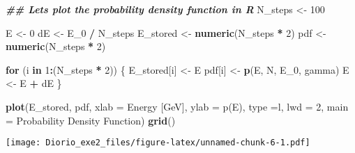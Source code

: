 \documentclass[
]{article}
\newenvironment{Shaded}{\begin{snugshade}}{\end{snugshade}}
\newcommand{\AttributeTok}[1]{\textcolor[rgb]{0.13,0.29,0.53}{#1}}
\newcommand{\ControlFlowTok}[1]{\textcolor[rgb]{0.13,0.29,0.53}{\textbf{#1}}}
\newcommand{\DecValTok}[1]{\textcolor[rgb]{0.00,0.00,0.81}{#1}}
\newcommand{\DocumentationTok}[1]{\textcolor[rgb]{0.56,0.35,0.01}{\textbf{\textit{#1}}}}
\newcommand{\FunctionTok}[1]{\textcolor[rgb]{0.13,0.29,0.53}{\textbf{#1}}}
\newcommand{\NormalTok}[1]{#1}
\newcommand{\OtherTok}[1]{\textcolor[rgb]{0.56,0.35,0.01}{#1}}
\newcommand{\SpecialCharTok}[1]{\textcolor[rgb]{0.81,0.36,0.00}{\textbf{#1}}}
\newcommand{\StringTok}[1]{\textcolor[rgb]{0.31,0.60,0.02}{#1}}
\begin{document}
\begin{Shaded}
\begin{Highlighting}[]
\DocumentationTok{\#\# Let\textquotesingle{}s plot the probability density function in R}
\NormalTok{N\_steps }\OtherTok{\textless{}{-}} \DecValTok{100}

\NormalTok{E }\OtherTok{\textless{}{-}} \DecValTok{0}
\NormalTok{dE }\OtherTok{\textless{}{-}}\NormalTok{ E\_0 }\SpecialCharTok{/}\NormalTok{ N\_steps }
\NormalTok{E\_stored }\OtherTok{\textless{}{-}} \FunctionTok{numeric}\NormalTok{(N\_steps }\SpecialCharTok{*} \DecValTok{2}\NormalTok{)}
\NormalTok{pdf }\OtherTok{\textless{}{-}} \FunctionTok{numeric}\NormalTok{(N\_steps }\SpecialCharTok{*} \DecValTok{2}\NormalTok{)}

\ControlFlowTok{for}\NormalTok{ (i }\ControlFlowTok{in} \DecValTok{1}\SpecialCharTok{:}\NormalTok{(N\_steps }\SpecialCharTok{*} \DecValTok{2}\NormalTok{)) \{}
\NormalTok{  E\_stored[i] }\OtherTok{\textless{}{-}}\NormalTok{ E}
\NormalTok{  pdf[i] }\OtherTok{\textless{}{-}}  \FunctionTok{p}\NormalTok{(E, N, E\_0, gamma)}
\NormalTok{  E }\OtherTok{\textless{}{-}}\NormalTok{ E }\SpecialCharTok{+}\NormalTok{ dE}
\NormalTok{\}}

\FunctionTok{plot}\NormalTok{(E\_stored, pdf, }
     \AttributeTok{xlab =} \StringTok{\textquotesingle{}Energy [GeV]\textquotesingle{}}\NormalTok{,}
     \AttributeTok{ylab =} \StringTok{\textquotesingle{}p(E)\textquotesingle{}}\NormalTok{, }
     \AttributeTok{type  =}\StringTok{\textquotesingle{}l\textquotesingle{}}\NormalTok{, }\AttributeTok{lwd =} \DecValTok{2}\NormalTok{, }
     \AttributeTok{main =} \StringTok{\textquotesingle{}Probability Density Function\textquotesingle{}}\NormalTok{)}
\FunctionTok{grid}\NormalTok{()}
\end{Highlighting}
\end{Shaded}

\texttt{[image: Diorio\_exe2\_files/figure-latex/unnamed-chunk-6-1.pdf]}
\end{document}
